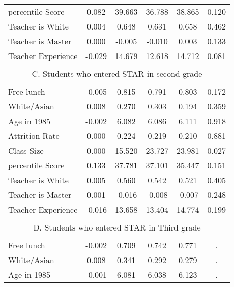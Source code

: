 \documentclass{article}
\begin{document}
{{{{{{{{\begin{table}[htbp]
\begin{tabular}{llccccc}
    \multicolumn{2}{l}{percentile Score} & 0.082  & 39.663  & 36.788  & 38.865  & 0.120  \\
    \multicolumn{2}{l}{Teacher is White} & 0.004  & 0.648  & 0.631  & 0.658  & 0.462  \\
    \multicolumn{2}{l}{Teacher is Master} & 0.000  & -0.005  & -0.010  & 0.003  & 0.133  \\
    \multicolumn{2}{l}{Teacher Experience} & -0.029  & 14.679  & 12.618  & 14.712  & 0.081  \\
          &       &       &       &       &       &  \\
    \multicolumn{7}{c}{C. Students who entered STAR in second grade} \\
          &       &       &       &       &       &  \\
    \multicolumn{2}{l}{Free lunch} & -0.005  & 0.815  & 0.791  & 0.803  & 0.172  \\
    \multicolumn{2}{l}{White/Asian} & 0.008  & 0.270  & 0.303  & 0.194  & 0.359  \\
    \multicolumn{2}{l}{Age in 1985} & -0.002  & 6.082  & 6.086  & 6.111  & 0.918  \\
    \multicolumn{2}{l}{Attrition Rate} & 0.000  & 0.224  & 0.219  & 0.210  & 0.881  \\
    \multicolumn{2}{l}{Class Size} & 0.000  & 15.520  & 23.727  & 23.981  & 0.027  \\
    \multicolumn{2}{l}{percentile Score} & 0.133  & 37.781  & 37.101  & 35.447  & 0.151  \\
    \multicolumn{2}{l}{Teacher is White} & 0.005  & 0.560  & 0.542  & 0.521  & 0.405  \\
    \multicolumn{2}{l}{Teacher is Master} & 0.001  & -0.016  & -0.008  & -0.007  & 0.248  \\
    \multicolumn{2}{l}{Teacher Experience} & -0.016  & 13.658  & 13.404  & 14.774  & 0.199  \\
          &       &       &       &       &       &  \\
    \multicolumn{7}{c}{D. Students who entered STAR in Third grade} \\
          &       &       &       &       &       &  \\
    \multicolumn{2}{l}{Free lunch} & -0.002  & 0.709  & 0.742  & 0.771  & . \\
    \multicolumn{2}{l}{White/Asian} & 0.008  & 0.341  & 0.292  & 0.279  & . \\
    \multicolumn{2}{l}{Age in 1985} & -0.001  & 6.081  & 6.038  & 6.123  & . \\

\end{tabular}
\end{table}}}}}}}}}
\end{document}
